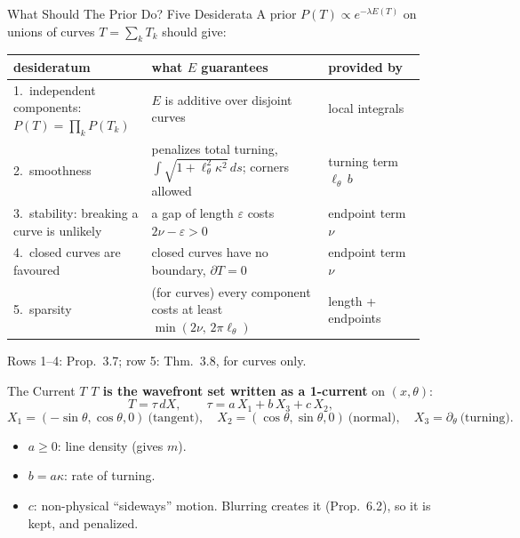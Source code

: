\documentclass[aspectratio=169]{beamer}
\begin{document}
\begin{frame}{What Should The Prior Do? Five Desiderata}
  A prior $P(T)\propto e^{-\lambda E(T)}$ on unions of curves $T=\sum_k T_k$ should give:
  \vspace{0.5em}
  \begin{center}
  \small
  \renewcommand{\arraystretch}{1.25}
  \begin{tabular}{@{}>{\raggedright}p{0.30\linewidth}>{\raggedright}p{0.40\linewidth}>{\raggedright\arraybackslash}p{0.22\linewidth}@{}}
    \toprule
    \textbf{desideratum} & \textbf{what $E$ guarantees} & \textbf{provided by} \\
    \midrule
    1.\ independent components: $P(T)=\prod_k P(T_k)$ & $E$ is additive over disjoint curves & local integrals \\
    2.\ smoothness & penalizes total turning, $\int\!\sqrt{1+\ell_\theta^2\kappa^2}\,ds$; corners allowed & turning term $\ell_\theta\,b$ \\
    3.\ stability: breaking a curve is unlikely & a gap of length $\varepsilon$ costs $2\nu-\varepsilon>0$ & endpoint term $\nu$ \\
    4.\ closed curves are favoured & closed curves have no boundary, $\partial T=0$ & endpoint term $\nu$ \\
    5.\ sparsity & (for curves) every component costs at least $\min(2\nu,\,2\pi\ell_\theta)$ & length + endpoints \\
    \bottomrule
  \end{tabular}
  \end{center}
  \vspace{0.3em}
  \small Rows 1--4: Prop.~3.7; row 5: Thm.~3.8, for curves only.
\end{frame}

\begin{frame}{The Current $T$}
  \textbf{$T$ is the wavefront set written as a 1-current} on $(x,\theta)$:
  \[
    T=\tau\,dX,\qquad \tau = a\,X_1 + b\,X_3 + c\,X_2,
  \]
  \[
    X_1=(-\sin\theta,\cos\theta,0)\ \text{(tangent)},\quad X_2=(\cos\theta,\sin\theta,0)\ \text{(normal)},\quad X_3=\partial_\theta\ \text{(turning)}.
  \]
  \begin{itemize}
    \item $a\ge0$: line density (gives $m$).
    \item $b=a\kappa$: rate of turning.
    \item $c$: non-physical ``sideways'' motion. Blurring creates it (Prop.~6.2), so it is kept, and penalized.
  \end{itemize}
\end{frame}
\end{document}
